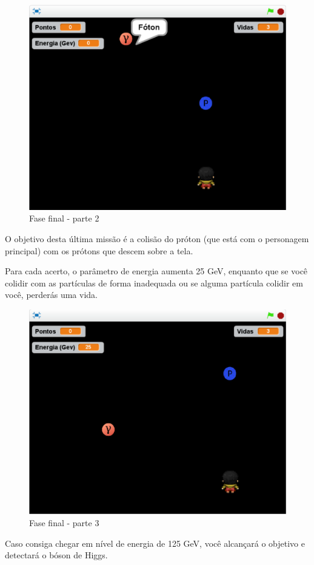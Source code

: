 \documentclass[12pt,fleqn]{book} %
\begin{document}
\begin{figure}[h]
	\centering
	\includegraphics[width=0.65 \textwidth]{Produto/final2}
	\caption{Fase final - parte 2}
	\label{fig:app_a:final2}
\end{figure}

\newpage

O objetivo desta última missão é a colisão do próton (que está com o personagem principal) com os prótons que descem sobre a tela.

Para cada acerto, o parâmetro de energia aumenta 25 GeV, enquanto que se você colidir com as partículas de forma inadequada ou se alguma partícula colidir em você, perderás uma vida.

\begin{figure}[h]
	\centering
	\includegraphics[width=0.65 \textwidth]{Produto/final3}
	\caption{Fase final - parte 3}
	\label{fig:app_a:final3}
\end{figure}


Caso consiga chegar em nível de energia de 125 GeV, você alcançará o objetivo e detectará o bóson de Higgs.
\end{document}
